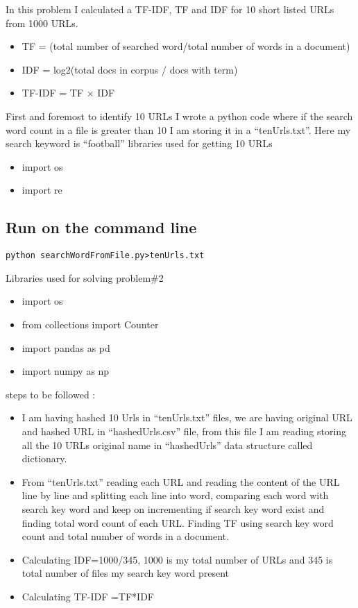 \documentclass[letterpaper,11pt]{article}
\begin{document}
In this problem I calculated a TF-IDF, TF and  IDF  for 10 short  listed URLs from 1000 URLs.
\begin{itemize}
    \item TF = (total number of searched word/total number of words in a document)
    \item IDF = log2(total docs in corpus / docs with term)
    \item TF-IDF = TF × IDF
\end{itemize}

First and foremost to identify 10 URLs I wrote a python code where if the search word count in a file is greater than 10  I am storing it in a “tenUrls.txt”.  Here my search keyword is “football”
libraries used for getting 10 URLs
\begin{itemize}
    \item import os
    \item import re
\end{itemize}
\subsection*{Run on the command line}
\begin{lstlisting}[frame=single]
python searchWordFromFile.py>tenUrls.txt
\end{lstlisting}


Libraries used for solving problem\#2
\begin{itemize}
    \item import os
    \item from collections import Counter
    \item import pandas as pd
    \item import numpy as np
\end{itemize}
 steps to be followed :
\begin{itemize}
    \item I am having hashed 10 Urls in “tenUrls.txt” files, we are having original URL and hashed URL in “hashedUrls.csv” file, from this file I am reading storing all the 10 URLs original name in “hashedUrls” data structure called dictionary. 
    \item From “tenUrls.txt” reading each URL and reading the content of the URL line by line and splitting each line into word, comparing each word with search key word and keep on incrementing if search key word exist and finding total word count of each URL. Finding TF using search key word count and total number of words in a document.
    \item Calculating IDF=1000/345, 1000 is my total number of URLs and 345 is total number of files my search key word present
    \item Calculating TF-IDF =TF*IDF
\end{itemize}
\end{document}
